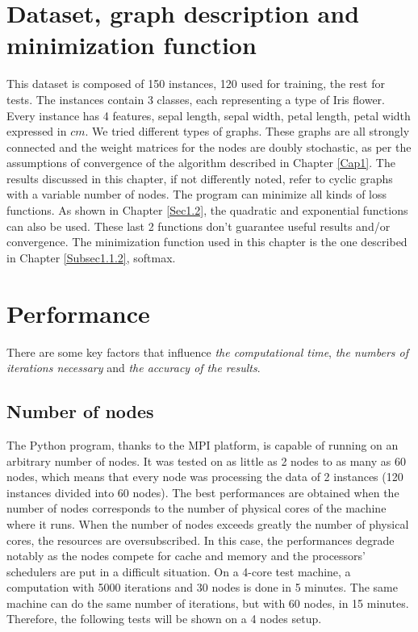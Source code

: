 \documentclass[a4paper,11pt,oneside]{book}
\begin{document}
\section{Dataset, graph description and minimization function} \label{Sec2.1}
This dataset is composed of 150 instances, 120 used for training, the rest for tests. The instances contain 3 classes, each representing a type of Iris flower. Every instance has 4 features, sepal length, sepal width, petal length, petal width expressed in $cm$. We tried different types of graphs. These graphs are all strongly connected and the weight matrices for the nodes are doubly stochastic, as per the assumptions of convergence of the algorithm described in Chapter \ref{Cap1}. The results discussed in this chapter, if not differently noted, refer to cyclic graphs with a variable number of nodes. The program can minimize all kinds of loss functions. As shown in Chapter \ref{Sec1.2}, the quadratic and exponential functions can also be used. These last 2 functions don't guarantee useful results and/or convergence. The minimization function used in this chapter is the one described in Chapter \ref{Subsec1.1.2}, softmax.

\section{Performance} \label{Sec2.2}
There are some key factors that influence \textit{the computational time}, \textit{the numbers of iterations necessary} and \textit{the accuracy of the results}.\\

\subsection{Number of nodes} \label{Subsec2.2.1}
The Python program, thanks to the MPI platform, is capable of running on an arbitrary number of nodes. It was tested on as little as 2 nodes to as many as 60 nodes, which means that every node was processing the data of 2 instances (120 instances divided into 60 nodes). The best performances are obtained when the number of nodes corresponds to the number of physical cores of the machine where it runs. When the number of nodes exceeds greatly the number of physical cores, the resources are oversubscribed. In this case, the performances degrade notably as the nodes compete for cache and memory and the processors' schedulers are put in a difficult situation. On a 4-core test machine, a computation with 5000 iterations and 30 nodes is done in 5 minutes. The same machine can do the same number of iterations, but with 60 nodes, in 15 minutes. Therefore, the following tests will be shown on a 4 nodes setup. \\
\end{document}
